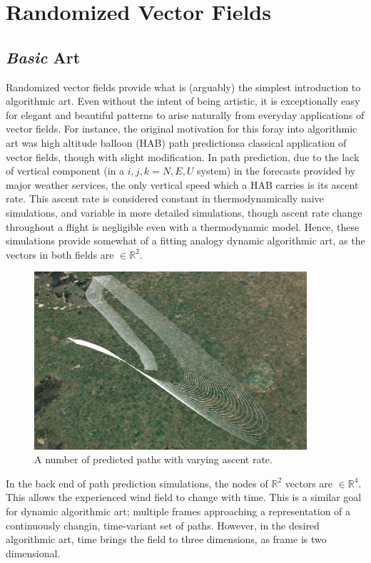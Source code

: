 \documentclass[a4paper]{article}
\begin{document}
\section{Randomized Vector Fields}
\subsection{\textit{Basic} Art}
Randomized vector fields provide what is (arguably) the simplest introduction to algorithmic art. Even without the intent of being artistic, it is exceptionally easy for elegant and beautiful patterns to arise naturally from everyday applications of vector fields. For instance, the original motivation for this foray into algorithmic art was high altitude balloon (HAB) path predictions\textemdash a classical application of vector fields, though with slight modification. In path prediction, due to the lack of vertical component (in a $i,j,k=N,E,U$ system) in the forecasts provided by major weather services, the only vertical speed which a HAB carries is its ascent rate. This ascent rate is considered constant in thermodynamically naive simulations, and variable in more detailed simulations, though ascent rate change throughout a flight is negligible even with a thermodynamic model. Hence, these simulations provide somewhat of a fitting analogy dynamic algorithmic art, as the vectors in both fields are $\in \mathbb{R}^{2}$.
\begin{figure}[H]
  \centering
  \includegraphics[width=0.9\textwidth]{media/ballet_example.png}
  \caption{A number of predicted paths with varying ascent rate.}
\end{figure}
In the back end of path prediction simulations, the nodes of $\mathbb{R}^{2}$ vectors are $\in \mathbb{R}^{4}$. This allows the experienced wind field to change with time. This is a similar goal for dynamic algorithmic art; multiple frames approaching a representation of a continuously changin, time-variant set of paths. However, in the desired algorithmic art, time brings the field to three dimensions, as frame is two dimensional.
\end{document}

